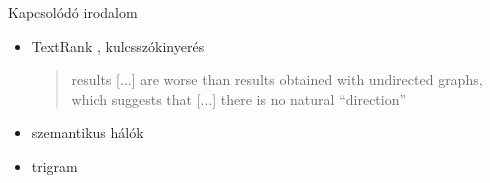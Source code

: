 \documentclass{beamer}
\newlength{\sepwid}
\newlength{\onecolwid}
\begin{document}
\begin{frame}[t]
\begin{columns}[t]
\begin{column}{\onecolwid}

      \begin{block}{Kapcsolódó irodalom} 
        \begin{itemize}
          \item TextRank \citep{mihalcea2004textrank}, kulcsszókinyerés
            \begin{quote}
              results [...] are worse than results obtained with undirected
                graphs, which suggests that [...] there is no natural “direction”
            \end{quote}
          \item szemantikus hálók \citep{steyvers2005large}
          \item trigram \citep{cancho2001thesmall}
        \end{itemize}
      \end{block}

    \end{column}

        \begin{column}{\sepwid}\end{column}			%


\end{columns}
\end{frame}
\end{document}
